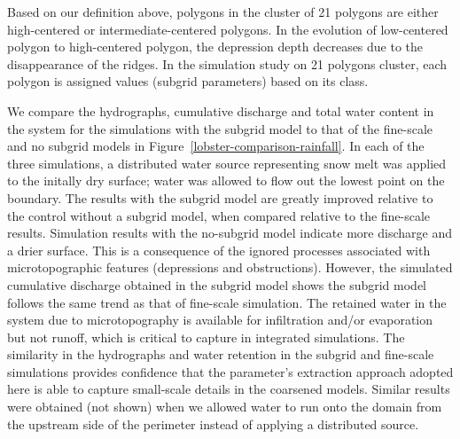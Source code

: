Based on our definition above, polygons in the cluster of 21 polygons are either high-centered or intermediate-centered polygons.
In the evolution of low-centered polygon to high-centered polygon, the depression depth decreases due to the disappearance of the ridges. In the simulation study on 21 polygons cluster, each polygon is assigned values (subgrid parameters) based on its class.

We compare the hydrographs, cumulative discharge and total water content in the system for the simulations with the subgrid model to that of the fine-scale and no subgrid models in Figure~\ref{lobster-comparison-rainfall}. In each of the three simulations, a distributed water source representing snow melt was applied to the initally dry surface; water was allowed to flow out the lowest point on the boundary. 
The results with the subgrid model are greatly improved relative to the control without a subgrid model, when compared relative to the fine-scale results.
Simulation results with the no-subgrid model indicate more discharge and a drier surface.
This is a consequence of the ignored processes associated with microtopographic features (depressions and obstructions).
However, the simulated cumulative discharge obtained in the subgrid model shows the subgrid model follows the same trend as that of fine-scale simulation.
The retained water in the system due to microtopography is available for infiltration and/or evaporation but not runoff, which is critical to capture in integrated simulations.
The similarity in the hydrographs and water retention in the subgrid and fine-scale simulations provides confidence that the parameter's extraction approach adopted here is able to capture small-scale details in the coarsened models. Similar results were obtained (not shown) when we allowed water to run onto the domain from the upstream side of the perimeter instead of applying a distributed source.  

